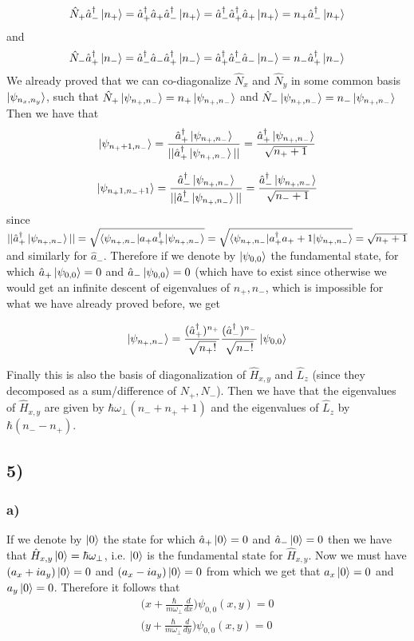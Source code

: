 \documentclass[10pt,a4paper]{book}
\begin{document}
$$\hat{N}_{+}\hat{a}_{-}^{\dagger}\ket{n_{+}}=\hat{a}_+^{\dagger}\hat{a}_+\hat{a}_-^{\dagger}\ket{n_+}=\hat{a}_-^{\dagger}\hat{a}_+^{\dagger}\hat{a}_+\ket{n_+}=n_+\hat{a}^{\dagger}_-\ket{n_+}$$
and 
$$\hat{N}_{-}\hat{a}_{+}^{\dagger}\ket{n_{-}}=\hat{a}_-^{\dagger}\hat{a}_-\hat{a}_+^{\dagger}\ket{n_-}=\hat{a}_+^{\dagger}\hat{a}_-^{\dagger}\hat{a}_-\ket{n_-}=n_-\hat{a}^{\dagger}_+\ket{n_-}$$
We already proved that we can co-diagonalize $\hat{N}_x$ and $\hat{N}_y$ in some common basis $\ket{\psi_{n_x,n_y}}$, such that
$\hat{N}_+\ket{\psi_{n_+,n_-}}=n_+\ket{\psi_{n_+,n_-}}$ and $\hat{N}_-\ket{\psi_{n_+,n_-}}=n_-\ket{\psi_{n_+,n_-}}$
Then we have that 
$$\ket{\psi_{n_++1,n_-}}=\frac{\hat{a}_+^{\dagger}\ket{\psi_{n_+,n_-}}}{||\hat{a}_+^{\dagger}\ket{\psi_{n_+,n_-}}||}=\frac{\hat{a}_+^{\dagger}\ket{\psi_{n_+,n_-}}}{\sqrt{n_++1}}$$

$$\ket{\psi_{n_+1,n_-+1}}=\frac{\hat{a}_-^{\dagger}\ket{\psi_{n_+,n_-}}}{||\hat{a}_-^{\dagger}\ket{\psi_{n_+,n_-}}||}=\frac{\hat{a}_-^{\dagger}\ket{\psi_{n_+,n_-}}}{\sqrt{n_-+1}}$$
since $||\hat{a}_+^{\dagger}\ket{\psi_{n_+,n_-}}||=\sqrt{\braket{\psi_{n_+,n_-}|a_+a_+^{\dagger}|\psi_{n_+,n_-}}}=\sqrt{\braket{\psi_{n_+,n_-}|a_+^{\dagger}a_++1|\psi_{n_+,n_-}}}=\sqrt{n_++1}$ and similarly for $\hat{a}_-$.
Therefore if we denote by $\ket{\psi_{0,0}}$ the fundamental state, for which $\hat{a}_+\ket{\psi_{0,0}}=0$ and $\hat{a}_-\ket{\psi_{0,0}}=0$ (which have to exist since otherwise we would get an infinite descent of eigenvalues of $n_+,n_-$, which is impossible for what we have already proved before, we get

$$\ket{\psi_{n_+,n_-}}=\frac{(\hat{a}_+^{\dagger})^{n_+}}{\sqrt{n_+!}}\frac{(\hat{a}_-^{\dagger})^{n_-}}{\sqrt{n_-!}}\ket{\psi_{0,0}}$$

Finally this is also the basis of diagonalization of $\hat{H}_{x,y}$ and $\hat{L}_z$ (since they decomposed as a sum/difference of $N_+,N_-$). Then we have that the eigenvalues of $\hat{H}_{x,y}$ are given by $\hbar\omega_{\perp}(n_-+n_++1)$ and the eigenvalues of $\hat{L}_z$ by $\hbar(n_--n_+)$.

\subsection*{5)}

\subsubsection*{a)}

If we denote by $\ket{0}$ the state for which $\hat{a}_+\ket{0}=0$ and $\hat{a}_-\ket{0}=0$ then we have that $\hat{H}_{x,y}\ket{0}=\hbar\omega_{\perp}$, i.e. $\ket{0}$ is the fundamental state for $\hat{H}_{x,y}$. Now we must have $(a_x+ia_y)\ket{0}=0$ and $(a_x-ia_y)\ket{0}=0$ from which we get that $a_x\ket{0}=0$ and $a_y\ket{0}=0$. Therefore it follows that 
\begin{align*}
\bigg(x+\frac{\hbar}{m\omega_{\perp}}\frac{d}{dx}\bigg)\psi_{0,0}(x,y)=0\\
\bigg(y+\frac{\hbar}{m\omega_{\perp}}\frac{d}{dy}\bigg)\psi_{0,0}(x,y)=0
\end{align*}
\end{document}
